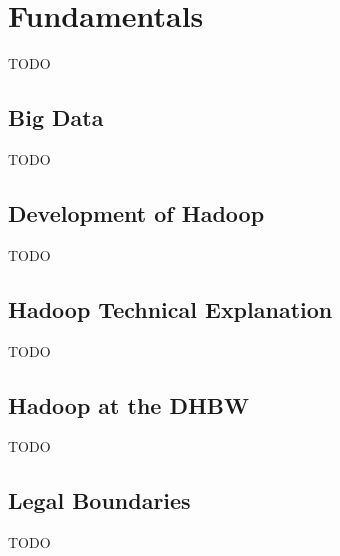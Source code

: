 \chapter{Fundamentals}
\label{chap:fund}

TODO

\section{Big Data}

TODO

\section{Development of Hadoop}

TODO

\section{Hadoop Technical Explanation}

TODO

\section{Hadoop at the DHBW}

TODO

\section{Legal Boundaries}

TODO